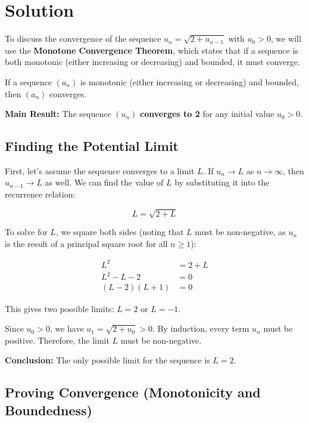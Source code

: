 \documentclass[12pt,a4paper]{article}
\theoremstyle{definition}
\begin{document}
\section{Solution}

To discuss the convergence of the sequence $u_n = \sqrt{2 + u_{n-1}}$ with $u_0 > 0$, we will use the \textbf{Monotone Convergence Theorem}, which states that if a sequence is both monotonic (either increasing or decreasing) and bounded, it must converge.

\begin{tcolorbox}[title=Monotone Convergence Theorem, colback=blue!5!white, colframe=blue!75!black]
If a sequence $(a_n)$ is monotonic (either increasing or decreasing) and bounded, then $(a_n)$ converges.
\end{tcolorbox}

\textbf{Main Result:} The sequence $(u_n)$ \textbf{converges to 2} for any initial value $u_0 > 0$.

\subsection{Finding the Potential Limit}

First, let's assume the sequence converges to a limit $L$. If $u_n \to L$ as $n \to \infty$, then $u_{n-1} \to L$ as well. We can find the value of $L$ by substituting it into the recurrence relation:

\[
L = \sqrt{2 + L}
\]

To solve for $L$, we square both sides (noting that $L$ must be non-negative, as $u_n$ is the result of a principal square root for all $n \ge 1$):

\begin{align*}
L^2 &= 2 + L\\
L^2 - L - 2 &= 0\\
(L - 2)(L + 1) &= 0
\end{align*}

This gives two possible limits: $L = 2$ or $L = -1$.

Since $u_0 > 0$, we have $u_1 = \sqrt{2 + u_0} > 0$. By induction, every term $u_n$ must be positive. Therefore, the limit $L$ must be non-negative.

\textbf{Conclusion:} The only possible limit for the sequence is $L = 2$.

\subsection{Proving Convergence (Monotonicity and Boundedness)}
\end{document}
